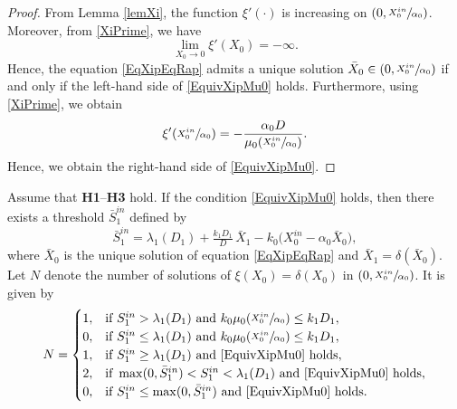 \documentclass[runningheads]{llncs}
\begin{document}
\begin{proof}
From Lemma \ref{lemXi}, the function $\xi'(\cdot)$ is  increasing on 
$\left(0,\sfrac{X_0^{in}}{\alpha_0}\right)$. 
Moreover, from \eqref{XiPrime}, we have
\[
\lim_{X_0\to 0} \xi'(X_0) = -\infty.
\]
Hence, the equation \eqref{EqXipEqRap} admits a unique solution 
$\bar X_0 \in \left(0,\sfrac{X_0^{in}}{\alpha_0}\right)$
if and only if the left-hand side of \eqref{EquivXipMu0} holds.
Furthermore, using \eqref{XiPrime}, we obtain
\[
\xi'\!\left(\sfrac{X_0^{in}}{\alpha_0}\right) 
= -\frac{\alpha_0 D}{\mu_0\!\left(\sfrac{X_0^{in}}{\alpha_0}\right)}.
\]
Hence, we obtain the right-hand side of \eqref{EquivXipMu0}.
\end{proof}
\begin{proposition} \label{PropMultiComp}
Assume that {\bf H1}--{\bf H3} hold. 
If the condition \eqref{EquivXipMu0} holds, then there exists a threshold $\bar{S}_1^{in}$ defined by 
\begin{equation}            \label{ExpS1inbar}
\bar{S}_1^{in} = \lambda_1(D_1) + \tfrac{k_1 D_1}{D}\,\bar X_1
- k_0 \big(X_0^{in}-\alpha_0 \bar X_0\big),
\end{equation}
where $\bar X_0$ is the unique solution of equation \eqref{EqXipEqRap} and $\bar X_1 = \delta(\bar X_0)$.
Let $N$ denote the number of solutions of $\xi(X_0)=\delta(X_0)$ in $\left(0,\sfrac{X_0^{in}}{\alpha_0}\right)$. It is given by
\begin{equation}                      \label{NumberN}
N =
\begin{cases}
1, & \text{if } S_1^{in} > \lambda_1(D_1) 
\ \text{and } k_0 \mu_0\!\left(\sfrac{X_0^{in}}{\alpha_0}\right) \le k_1 D_1, \\
0, & \text{if } S_1^{in} \le \lambda_1(D_1) 
\ \text{and } k_0 \mu_0\!\left(\sfrac{X_0^{in}}{\alpha_0}\right) \le k_1 D_1, \\
1, & \text{if } S_1^{in} \ge \lambda_1(D_1) 
\ \text{and } \eqref{EquivXipMu0} \text{ holds}, \\
2, & \text{if } \max(0,\bar S_1^{in}) < S_1^{in} < \lambda_1(D_1) 
\ \text{and } \eqref{EquivXipMu0} \text{ holds}, \\
0, & \text{if } S_1^{in} \le \max(0,\bar S_1^{in}) 
\ \text{and } \eqref{EquivXipMu0} \text{ holds}.
\end{cases}
\end{equation}
\end{proposition}
\end{document}
